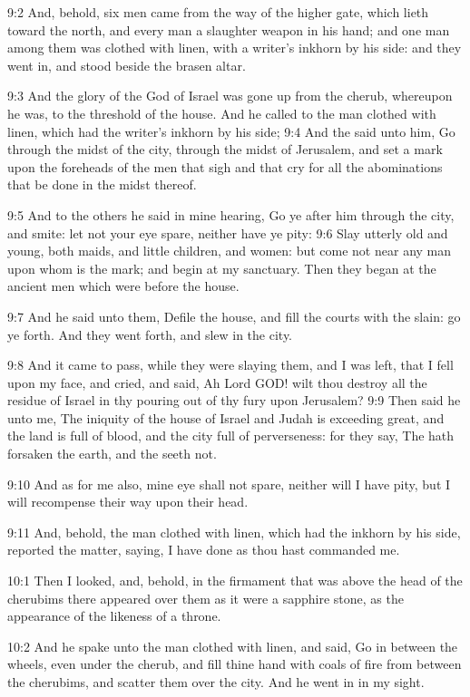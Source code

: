 9:2 And, behold, six men came from the way of the higher gate, which
lieth toward the north, and every man a slaughter weapon in his hand;
and one man among them was clothed with linen, with a writer's inkhorn
by his side: and they went in, and stood beside the brasen altar.

9:3 And the glory of the God of Israel was gone up from the cherub,
whereupon he was, to the threshold of the house. And he called to the
man clothed with linen, which had the writer's inkhorn by his side;
9:4 And the \LORD said unto him, Go through the midst of the city,
through the midst of Jerusalem, and set a mark upon the foreheads of
the men that sigh and that cry for all the abominations that be done
in the midst thereof.

9:5 And to the others he said in mine hearing, Go ye after him through
the city, and smite: let not your eye spare, neither have ye pity: 9:6
Slay utterly old and young, both maids, and little children, and
women: but come not near any man upon whom is the mark; and begin at
my sanctuary. Then they began at the ancient men which were before the
house.

9:7 And he said unto them, Defile the house, and fill the courts with
the slain: go ye forth. And they went forth, and slew in the city.

9:8 And it came to pass, while they were slaying them, and I was left,
that I fell upon my face, and cried, and said, Ah Lord GOD! wilt thou
destroy all the residue of Israel in thy pouring out of thy fury upon
Jerusalem?  9:9 Then said he unto me, The iniquity of the house of
Israel and Judah is exceeding great, and the land is full of blood,
and the city full of perverseness: for they say, The \LORD hath
forsaken the earth, and the \LORD seeth not.

9:10 And as for me also, mine eye shall not spare, neither will I have
pity, but I will recompense their way upon their head.

9:11 And, behold, the man clothed with linen, which had the inkhorn by
his side, reported the matter, saying, I have done as thou hast
commanded me.

10:1 Then I looked, and, behold, in the firmament that was above the
head of the cherubims there appeared over them as it were a sapphire
stone, as the appearance of the likeness of a throne.

10:2 And he spake unto the man clothed with linen, and said, Go in
between the wheels, even under the cherub, and fill thine hand with
coals of fire from between the cherubims, and scatter them over the
city. And he went in in my sight.

